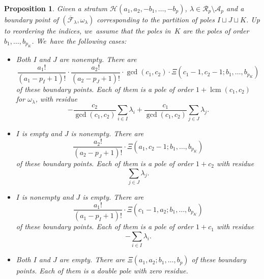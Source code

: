 \documentclass[JEP,XML,SOM,Unicode,NoFloatCountersInSection,published]{cedram}
\DeclareMathOperator{\lcm}{lcm}
\newtheorem{prop}[thm]{Proposition}
\theoremstyle{definition}
\begin{document}
\begin{prop}\label{prop:flat-boundary}
Given a stratum $\mathcal{H}(a_{1},a_{2},-b_{1},\dots,-b_{p})$, $\lambda \in \mathcal{R}_{p} \setminus \mathcal{A}_{p}$ and a boundary point of $(\overline{\mathcal{F}}_{\lambda}, \omega_\lambda)$ corresponding to the partition of poles $I \sqcup J \sqcup K$. Up to reordering the indices, we~assume that the poles in~$K$ are the poles of order $b_{1},\ldots,b_{p_{K}}$. We~have the following cases:

\begin{itemize}
\item
\emph{Both $I$ and $J$ are nonempty.} There are
\begin{equation}\label{eq:numbnoempty}
\frac{a_{1}!}{(a_{1}-p_{I}+1)!} \cdot \frac{a_{2}!}{(a_{2}-p_{J}+1)!} \cdot \gcd (c_1, c_2) \cdot \Xi(c_{1}-1,c_{2}-1;b_{1},\dots,b_{p_{K}})
\end{equation}
of these boundary points. Each of them is a pole of order
$1 + \lcm (c_1, c_2)$
for $\omega_{\lambda}$, with residue
\begin{equation}\label{eq:resIJnonempty}
-\frac{c_{2}}{\gcd(c_{1},c_{2})}\sum_{i \in I} \lambda_{i} + \frac{c_{1}}{\gcd(c_{1},c_{2})}\sum_{j \in J} \lambda_{j}.
\end{equation}

\item
\emph{$I$ is empty and $J$ is nonempty.} There are
\begin{equation}
\frac{a_{2}!}{(a_{2}-p_{J}+1)!} \cdot \Xi(a_{1},c_{2}-1;b_{1},\dots,b_{p_{K}})
\end{equation}
of these boundary points. Each of them is a pole of order $1 + c_{2}$ with residue
\begin{equation}\label{eq:residuecase2}
\sum_{j \in J} \lambda_{j}.
\end{equation}

\item
\emph{$I$ is nonempty and $J$ is empty.} There are
\begin{equation}
\frac{a_{1}!}{(a_{1}-p_{I}+1)!} \cdot \Xi(c_{1}-1,a_{2};b_{1},\dots,b_{p_{K}})
\end{equation}
of these boundary points. Each of them is a pole of order $1 + c_{1}$ with residue
\begin{equation}
-\sum_{i \in I} \lambda_{i} .
\end{equation}

\item
\emph{Both $I$ and $J$ are empty.} There are $\Xi(a_{1},a_{2};b_{1},\dots,b_{p})$ of these boundary points. Each of them is a double pole with zero residue.
\end{itemize}
\end{prop}
\end{document}
